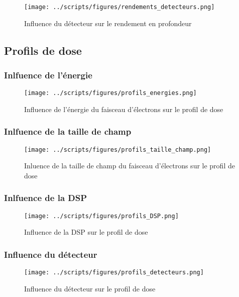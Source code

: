 \documentclass{article}
\begin{document}
\begin{figure}[h!]
  \centering
  \texttt{[image: ../scripts/figures/rendements\_detecteurs.png]}
  \caption{Influence du détecteur sur le rendement en profondeur}
  \label{fig_rdt_detecteur}
\end{figure}

\subsection{Profils de dose}
\subsubsection{Inlfuence de l'énergie}

\begin{figure}[h]
  \centering
  \texttt{[image: ../scripts/figures/profils\_energies.png]}
  \caption{Influence de l'énergie du faisceau d'électrons sur le profil de dose}
  \label{fig_profil_energie}
\end{figure}

\subsubsection{Inlfuence de la taille de champ}

\begin{figure}[h]
  \centering
  \texttt{[image: ../scripts/figures/profils\_taille\_champ.png]}
  \caption{Inluence de la taille de champ du faisceau d'électrons sur le profil de dose}
  \label{fig_profils_taille}
\end{figure}

\subsubsection{Inlfuence de la DSP}

\begin{figure}[h]
  \centering
  \texttt{[image: ../scripts/figures/profils\_DSP.png]}
  \caption{Influence de la DSP sur le profil de dose}
  \label{fig_profil_DSP}
\end{figure}

\subsubsection{Influence du détecteur}

\begin{figure}[h]
  \centering
  \texttt{[image: ../scripts/figures/profils\_detecteurs.png]}
  \caption{Influence du détecteur sur le profil de dose}
  \label{fig_profils_detecteur}
\end{figure}
\end{document}
